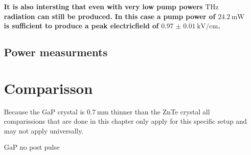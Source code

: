 \textbf{It is also intersting that even with very low pump powers $\si{\tera\hertz}$ radiation can still be produced.
In this case a pump power of $\SI{24.2}{\milli\W}$ is sufficient to produce a peak electricfield of $\SI{0.97(1)}{\kilo\V\per\centi\meter}$.}
\FloatBarrier
\subsection{Power measurments}

\FloatBarrier
\section{Comparisson}
Because the GaP crystal is $\SI{0.7}{\milli\meter}$ thinner than the ZnTe crystal all comparissions that are done in this chapter only apply for this specific setup and may not apply universally.


GaP no post pulse
